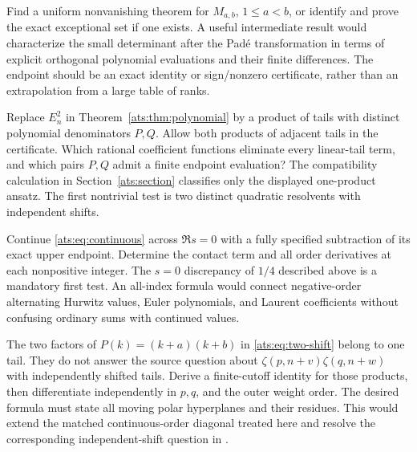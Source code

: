 \begin{question}
Find a uniform nonvanishing theorem for $M_{a,b}$, $1\le a<b$,
or identify and prove the exact exceptional set if one exists.
A useful intermediate result would characterize the small determinant
after the Pad\'e transformation in terms of explicit orthogonal
polynomial evaluations and their finite differences. The endpoint
should be an exact identity or sign/nonzero certificate, rather than
an extrapolation from a large table of ranks.
\end{question}

\begin{question}
Replace $E_n^2$ in Theorem~\ref{ats:thm:polynomial} by a product of
tails with distinct polynomial denominators $P,Q$. Allow both products
of adjacent tails in the certificate. Which rational coefficient
functions eliminate every linear-tail term, and which pairs $P,Q$
admit a finite endpoint evaluation? The compatibility calculation
in Section~\ref{ats:section} classifies only the displayed one-product
ansatz. The first nontrivial test is two distinct quadratic
resolvents with independent shifts.
\end{question}

\begin{question}
Continue \eqref{ats:eq:continuous} across $\Re s=0$ with a fully
specified subtraction of its exact upper endpoint. Determine the
contact term and all order derivatives at each nonpositive integer.
The $s=0$ discrepancy of $1/4$ described above is a mandatory first
test. An all-index formula would connect negative-order alternating
Hurwitz values, Euler polynomials, and Laurent coefficients without
confusing ordinary sums with continued values.
\end{question}

\begin{question}
The two factors of $P(k)=(k+a)(k+b)$ in
\eqref{ats:eq:two-shift} belong to one tail. They do not answer the
source question about
$\zeta(p,n+v)\zeta(q,n+w)$ with independently shifted tails.
Derive a finite-cutoff identity for those products, then differentiate
independently in $p,q$, and the outer weight order. The desired formula
must state all moving polar hyperplanes and their residues. This would
extend the matched continuous-order diagonal treated here and resolve
the corresponding independent-shift question in \cite{HTST}.
\end{question}

